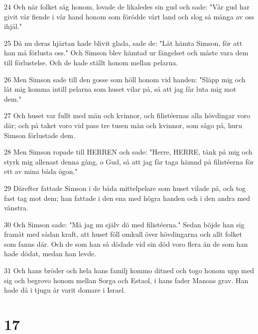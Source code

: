\par 24 Och när folket såg honom, lovade de likaledes sin gud och sade: "Vår gud har givit vår fiende i vår hand honom som förödde vårt land och slog så många av oss ihjäl."
\par 25 Då nu deras hjärtan hade blivit glada, sade de: "Låt hämta Simson, för att han må förlusta oss." Och Simson blev hämtad ur fängelset och måste vara dem till förlustelse. Och de hade ställt honom mellan pelarna.
\par 26 Men Simson sade till den gosse som höll honom vid handen: "Släpp mig och låt mig komma intill pelarna som huset vilar på, så att jag får luta mig mot dem."
\par 27 Och huset var fullt med män och kvinnor, och filistéernas alla hövdingar voro där; och på taket voro vid pass tre tusen män och kvinnor, som sågo på, huru Simson förlustade dem.
\par 28 Men Simson ropade till HERREN och sade: "Herre, HERRE, tänk på mig och styrk mig allenast denna gång, o Gud, så att jag får taga hämnd på filistéerna för ett av mina båda ögon."
\par 29 Därefter fattade Simson i de båda mittelpelare som huset vilade på, och tog fast tag mot dem; han fattade i den ena med högra handen och i den andra med vänstra.
\par 30 Och Simson sade: "Må jag nu själv dö med filistéerna." Sedan böjde han sig framåt med sådan kraft, att huset föll omkull över hövdingarna och allt folket som fanns där. Och de som han så dödade vid sin död voro flera än de som han hade dödat, medan han levde.
\par 31 Och hans bröder och hela hans familj kommo ditned och togo honom upp med sig och begrovo honom mellan Sorga och Estaol, i hans fader Manoas grav. Han hade då i tjugu år varit domare i Israel.

\chapter{17}

